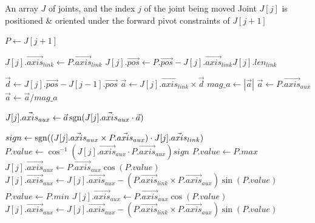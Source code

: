 \begin{algorithm}[h!]
\caption{Move Joint under Forward Pivot Constraints}
\label{alg:move_pivot}
\normalsize{
\begin{algorithmic}[1]
    \Require An array $J$ of joints, and the index $j$ of the joint being moved
    \Ensure Joint $J[j]$ is positioned \& oriented under the forward pivot constraints of $J[j+1]$

        \State $P\gets J[j+1]$
        \Statex

        \State $J[j].\vec{axis}_{link}\gets P.\vec{axis}_{link}$
        \State $J[j].\vec{pos}\gets P.\vec{pos}-J[j].\vec{axis}_{link}J[j].len_{link}$
        \Statex

        \State $\vec{d}\gets J[j].\vec{pos}-J[j-1].\vec{pos}$
        \State $\vec{a}\gets J[j].\vec{axis}_{link}\times\vec{d}$
        \State $mag\_a\gets|\vec{a}|$
            \State $\vec{a}\gets P.\vec{axis}_{aux}$
        \Else
            \State $\vec{a}\gets\vec{a}/mag\_a$
        \EndIf
        \Statex

        \State $J[j].\vec{axis}_{aux}\gets\vec{a}\operatorname{sgn}(J[j].\vec{axis}_{aux}\cdot\vec{a})$
        \Statex

        \State $sign\gets\operatorname{sgn}((J[j].\vec{axis}_{aux}\times P.\vec{axis}_{aux})\cdot J[j].\vec{axis}_{link})$
        \State $P.value\gets\cos^{-1}(J[j].\vec{axis}_{aux}\cdot P.\vec{axis}_{aux})sign$
                \State $P.value\gets P.max$
                \State $J[j].\vec{axis}_{aux}\gets P.\vec{axis}_{aux}\cos(P.value)$
                \State $J[j].\vec{axis}_{aux}\gets J[j].\vec{axis}_{aux}-(P.\vec{axis}_{link}\times P.\vec{axis}_{aux})\sin(P.value)$
                \State $P.value\gets P.min$
                \State $J[j].\vec{axis}_{aux}\gets P.\vec{axis}_{aux}\cos(P.value)$
                \State $J[j].\vec{axis}_{aux}\gets J[j].\vec{axis}_{aux}-(P.\vec{axis}_{link}\times P.\vec{axis}_{aux})\sin(P.value)$
            \EndIf
        \EndIf
    \EndFunction
\end{algorithmic}
}
\end{algorithm}


